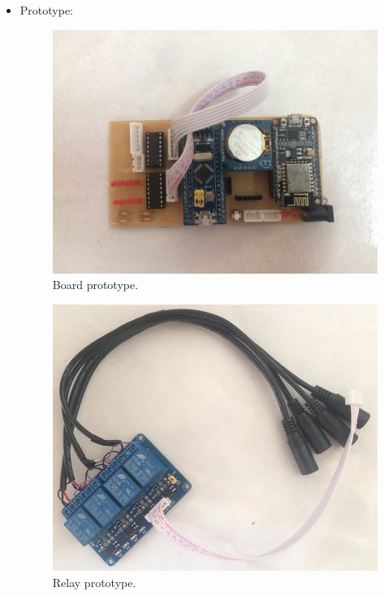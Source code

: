 \documentclass[a4paper,12pt,oneside]{article}
\begin{document}
\begin{itemize}
\item Prototype:
	\begin{figure}[H]
	\centering
	\includegraphics[scale=.5]{hinh/PPM/source_pro.jpg}
	\caption{Board prototype.}
	\end{figure}
	
	\begin{figure}[H]
	\centering
	\includegraphics[scale=.5]{hinh/relay_prototype.jpg}
	\caption{Relay prototype.}
	\end{figure}
	

\end{itemize}
\end{document}
